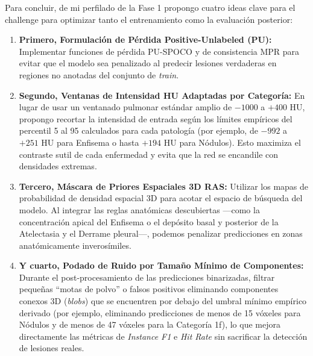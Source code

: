 \documentclass[11pt, a4paper]{article}
\begin{document}
Para concluir, de mi perfilado de la Fase 1 propongo cuatro ideas clave para el challenge para optimizar tanto el entrenamiento como la evaluación posterior:

\begin{enumerate}[leftmargin=1.5em]
    \item \textbf{Primero, Formulación de Pérdida Positive-Unlabeled (PU):} Implementar funciones de pérdida PU-SPOCO y de consistencia MPR para evitar que el modelo sea penalizado al predecir lesiones verdaderas en regiones no anotadas del conjunto de \textit{train}.
    \item \textbf{Segundo, Ventanas de Intensidad HU Adaptadas por Categoría:} En lugar de usar un ventanado pulmonar estándar amplio de $-1000$ a $+400$ HU, propongo recortar la intensidad de entrada según los límites empíricos del percentil 5 al 95 calculados para cada patología (por ejemplo, de $-992$ a $+251$ HU para Enfisema o hasta $+194$ HU para Nódulos). Esto maximiza el contraste sutil de cada enfermedad y evita que la red se encandile con densidades extremas.
    \item \textbf{Tercero, Máscara de Priores Espaciales 3D RAS:} Utilizar los mapas de probabilidad de densidad espacial 3D para acotar el espacio de búsqueda del modelo. Al integrar las reglas anatómicas descubiertas —como la concentración apical del Enfisema o el depósito basal y posterior de la Atelectasia y el Derrame pleural—, podemos penalizar predicciones en zonas anatómicamente inverosímiles.
    \item \textbf{Y cuarto, Podado de Ruido por Tamaño Mínimo de Componentes:} Durante el post-procesamiento de las predicciones binarizadas, filtrar pequeñas ``motas de polvo'' o falsos positivos eliminando componentes conexos 3D (\textit{blobs}) que se encuentren por debajo del umbral mínimo empírico derivado (por ejemplo, eliminando predicciones de menos de 15 vóxeles para Nódulos y de menos de 47 vóxeles para la Categoría 1f), lo que mejora directamente las métricas de \textit{Instance F1} e \textit{Hit Rate} sin sacrificar la detección de lesiones reales.
\end{enumerate}
\end{document}
